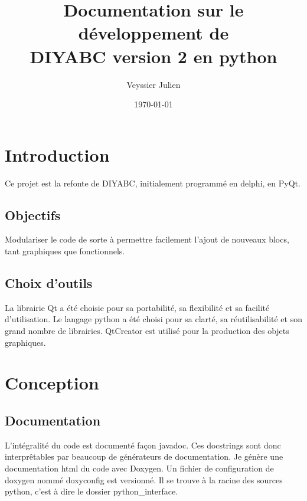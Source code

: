 \documentclass[12pt,a4paper]{article}
\author{Veyssier Julien}
\title{Documentation sur le développement de \\
DIYABC version 2 en python}
\date\today
\begin{document}
\maketitle
\newpage

\tableofcontents

\newpage
 

\section{Introduction}
Ce projet est la refonte de DIYABC, initialement programmé en delphi, en PyQt.
	\subsection{Objectifs}
        Modulariser le code de sorte à permettre facilement l'ajout de nouveaux
        blocs, tant graphiques que fonctionnels.

	\subsection{Choix d'outils}
        La librairie Qt a été choisie pour sa portabilité, sa flexibilité et sa
        facilité d'utilisation. Le langage python a été choisi pour sa clarté,
        sa réutilisabilité et son grand nombre de librairies. QtCreator est
        utilis\'e pour la production des objets graphiques.

\section{Conception}
    \subsection{Documentation}
    L'intégralité du code est documenté façon javadoc. Ces docstrings sont donc
    interprêtables par beaucoup de générateurs de documentation.  Je génère une
    documentation html du code avec Doxygen. Un fichier de configuration de
    doxygen nommé doxyconfig est versionné. Il se trouve à la racine des sources
    python, c'est à dire le dossier python\_interface.\\
\end{document}
